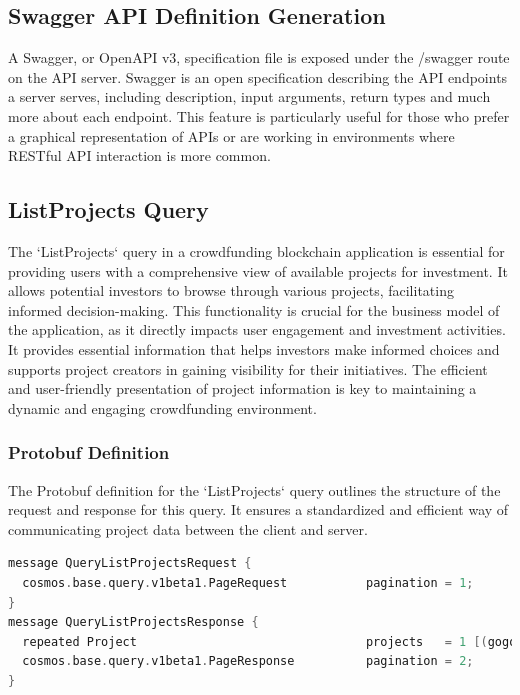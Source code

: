 \subsection{Swagger API Definition Generation}

A Swagger, or OpenAPI v3, specification file is exposed under the /swagger route on the API server. Swagger is an open specification describing the API endpoints a server serves, including description, input arguments, return types and much more about each endpoint. This feature is particularly useful for those who prefer a graphical representation of APIs or are working in environments where RESTful API interaction is more common.

\subsection{ListProjects Query}

The `ListProjects` query in a crowdfunding blockchain application is essential for providing users with a comprehensive view of available projects for investment. It allows potential investors to browse through various projects, facilitating informed decision-making. This functionality is crucial for the business model of the application, as it directly impacts user engagement and investment activities. It provides essential information that helps investors make informed choices and supports project creators in gaining visibility for their initiatives. The efficient and user-friendly presentation of project information is key to maintaining a dynamic and engaging crowdfunding environment.

\subsubsection{Protobuf Definition}

The Protobuf definition for the `ListProjects` query outlines the structure of the request and response for this query. It ensures a standardized and efficient way of communicating project data between the client and server.


\begin{lstlisting}[language=go, caption={Protobuf Definition for List Projects Query}]
message QueryListProjectsRequest {
  cosmos.base.query.v1beta1.PageRequest           pagination = 1;
}
message QueryListProjectsResponse {
  repeated Project                                projects   = 1 [(gogoproto.nullable) = false];
  cosmos.base.query.v1beta1.PageResponse          pagination = 2;
}
\end{lstlisting}

